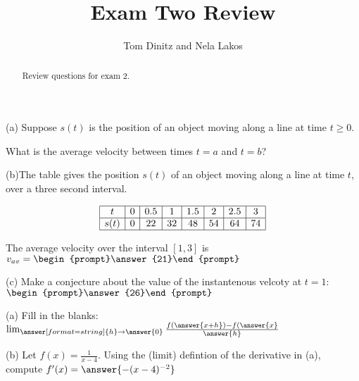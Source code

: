 \documentclass{ximera}
\author{Tom Dinitz and Nela Lakos}
\title{Exam Two Review}
\begin{document}
\begin{abstract}
Review questions for exam 2.
\end{abstract}
\maketitle

\begin{exercise}
(a) Suppose $s(t)$ is the position of an object moving along a line at time $t\geq 0$. 

What is the average velocity between times $t=a$ and $t=b$?
\begin{prompt}
\begin{multipleChoice}
\end{multipleChoice}
\end{prompt}

(b)The table gives the position $s(t)$ of an object moving along a line at time $t$, over a three second interval.

\[
\begin{array}{|c|c|c|c|c|c|c|c|}
\hline
t& 0& 0.5& 1& 1.5& 2& 2.5& 3\\ \hline
s(t)& 0 & 22 & 32 & 48 & 54 & 64 & 74 \\ \hline
\end{array}
\]

The average velocity over the interval $[1,3]$ is $v_{av}=\begin{prompt}\answer{21}\end{prompt}$

(c) Make a conjecture about the value of the instantenous velcoty at $t=1$: $\begin{prompt}\answer{26}\end{prompt}$
\end{exercise}

\begin{exercise}
(a) Fill in the blanks: $\lim_{\answer[format=string]{h}\to\answer{0}}\frac{f(\answer{x+h})-f(\answer{x}}{\answer{h}}$

(b) Let $f(x)=\frac{1}{x-4}$. Using the (limit) defintion of the derivative in (a), compute $f'(x)=\answer{-(x-4)^{-2}}$
\end{exercise}
\end{document}

